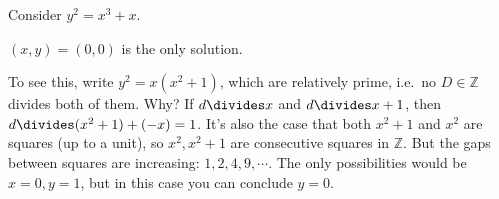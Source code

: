 \begin{example}[?]

Consider \(y^2 = x^3 + x\).

\begin{claim}

\((x, y) = (0, 0)\) is the only solution.

\end{claim}

To see this, write \(y^2 = x(x^2+1)\), which are relatively prime,
i.e.~no \(D\in {\mathbb{Z}}\) divides both of them. Why? If
\(d \divides x\) and \(d \divides x+1\), then
\(d\divides (x^2+1) + (-x) = 1\). It's also the case that both \(x^2+1\)
and \(x^2\) are squares (up to a unit), so \(x^2, x^2 + 1\) are
consecutive squares in \({\mathbb{Z}}\). But the gaps between squares
are increasing: \(1, 2, 4, 9, \cdots\). The only possibilities would be
\(x=0, y=1\), but in this case you can conclude \(y=0\).

\end{example}

